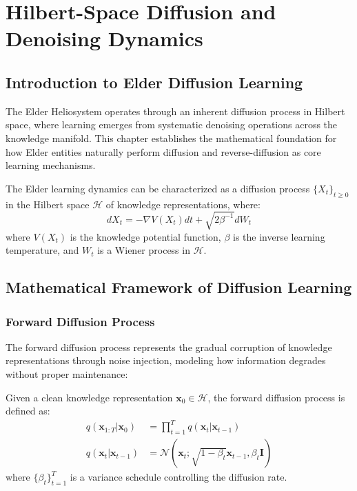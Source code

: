 \chapter{Hilbert-Space Diffusion and Denoising Dynamics}
\label{ch:hilbert_diffusion}

\section{Introduction to Elder Diffusion Learning}

The Elder Heliosystem operates through an inherent diffusion process in Hilbert space, where learning emerges from systematic denoising operations across the knowledge manifold. This chapter establishes the mathematical foundation for how Elder entities naturally perform diffusion and reverse-diffusion as core learning mechanisms.

\begin{definition}
The Elder learning dynamics can be characterized as a diffusion process $\{X_t\}_{t \geq 0}$ in the Hilbert space $\mathcal{H}$ of knowledge representations, where:
\begin{equation}
dX_t = -\nabla V(X_t) dt + \sqrt{2\beta^{-1}} dW_t
\end{equation}
where $V(X_t)$ is the knowledge potential function, $\beta$ is the inverse learning temperature, and $W_t$ is a Wiener process in $\mathcal{H}$.
\end{definition}

\section{Mathematical Framework of Diffusion Learning}

\subsection{Forward Diffusion Process}

The forward diffusion process represents the gradual corruption of knowledge representations through noise injection, modeling how information degrades without proper maintenance:

\begin{definition}
Given a clean knowledge representation $\mathbf{x}_0 \in \mathcal{H}$, the forward diffusion process is defined as:
\begin{align}
q(\mathbf{x}_{1:T} | \mathbf{x}_0) &= \prod_{t=1}^T q(\mathbf{x}_t | \mathbf{x}_{t-1}) \\
q(\mathbf{x}_t | \mathbf{x}_{t-1}) &= \mathcal{N}(\mathbf{x}_t; \sqrt{1-\beta_t}\mathbf{x}_{t-1}, \beta_t \mathbf{I})
\end{align}
where $\{\beta_t\}_{t=1}^T$ is a variance schedule controlling the diffusion rate.
\end{definition}

